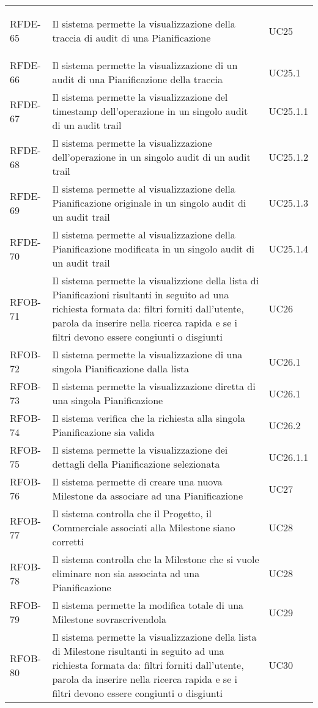 \begin{center}
\begin{longtable}{p{2.0cm}|p{8cm}|p{2.7cm}}
\hypertarget{rf65}{RFDE-65} & Il sistema permette la visualizzazione della traccia di audit di una Pianificazione & UC25\\
RFDE-66 & Il sistema permette la visualizzazione di un audit di una Pianificazione della traccia & UC25.1\\
RFDE-67 & Il sistema permette la visualizzazione del timestamp dell'operazione in un singolo audit di un audit trail & UC25.1.1\\
RFDE-68 & Il sistema permette la visualizzazione dell'operazione in un singolo audit di un audit trail & UC25.1.2\\
RFDE-69 & Il sistema permette al visualizzazione della Pianificazione originale in un singolo audit di un audit trail & UC25.1.3\\
RFDE-70 & Il sistema permette al visualizzazione della Pianificazione modificata in un singolo audit di un audit trail & UC25.1.4\\
RFOB-71 & Il sistema permette la visualizzione della lista di Pianificazioni risultanti in seguito ad una richiesta formata da: filtri forniti dall'utente, parola da inserire nella ricerca rapida e se i filtri devono essere congiunti o disgiunti & UC26\\
RFOB-72 & Il sistema permette la visualizzazione di una singola Pianificazione dalla lista & UC26.1\\
RFOB-73 & Il sistema permette la visualizzazione diretta di una singola Pianificazione & UC26.1\\
RFOB-74 & Il sistema verifica che la richiesta alla singola Pianificazione sia valida & UC26.2\\
RFOB-75 & Il sistema permette la visualizzazione dei dettagli della Pianificazione selezionata & UC26.1.1\\
RFOB-76 & Il sistema permette di creare una nuova Milestone da associare ad una Pianificazione & UC27\\
RFOB-77 & Il sistema controlla che il Progetto, il Commerciale associati alla Milestone siano corretti & UC28\\
RFOB-78 & Il sistema controlla che la Milestone che si vuole eliminare non sia associata ad una Pianificazione & UC28\\
RFOB-79 & Il sistema permette la modifica totale di una Milestone sovrascrivendola & UC29\\
RFOB-80 & Il sistema permette la visualizzazione della lista di Milestone risultanti in seguito ad una richiesta formata da: filtri forniti dall'utente, parola da inserire nella ricerca rapida e se i filtri devono essere congiunti o disgiunti & UC30\\

\end{longtable}
\end{center}
